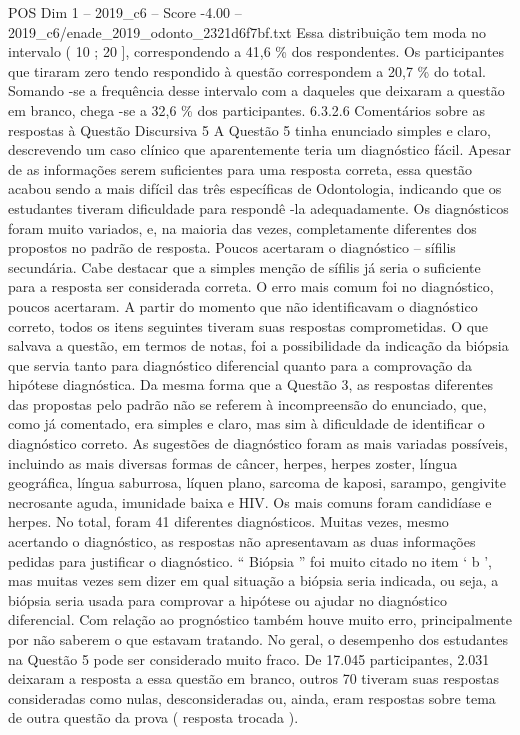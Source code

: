 \begin{textsample}{POS Dim 1 – 2019\_c6 – Score -4.00 – 2019\_c6/enade\_2019\_odonto\_2321d6f7bf.txt}
Essa distribuição tem moda no intervalo ( 10 ; 20 ], correspondendo a 41,6 \% dos respondentes.
Os participantes que tiraram zero tendo respondido à questão correspondem a 20,7 \% do total.
Somando -se a frequência desse intervalo com a daqueles que deixaram a questão em branco, chega -se a 32,6 \% dos participantes. 6.3.2.6 Comentários sobre as respostas à Questão Discursiva 5 A Questão 5 tinha enunciado simples e claro, descrevendo um caso clínico que aparentemente teria um diagnóstico fácil.
Apesar de as informações serem suficientes para uma resposta correta, essa questão acabou sendo a mais difícil das três específicas de Odontologia, indicando que os estudantes tiveram dificuldade para respondê -la adequadamente.
Os diagnósticos foram muito variados, e, na maioria das vezes, completamente diferentes dos propostos no padrão de resposta.
Poucos acertaram o diagnóstico – sífilis secundária.
Cabe destacar que a simples menção de sífilis já seria o suficiente para a resposta ser considerada correta.
O erro mais comum foi no diagnóstico, poucos acertaram.
A partir do momento que não identificavam o diagnóstico correto, todos os itens seguintes tiveram suas respostas comprometidas.
O que salvava a questão, em termos de notas, foi a possibilidade da indicação da biópsia que servia tanto para diagnóstico diferencial quanto para a comprovação da hipótese diagnóstica.
Da mesma forma que a Questão 3, as respostas diferentes das propostas pelo padrão não se referem à incompreensão do enunciado, que, como já comentado, era simples e claro, mas sim à dificuldade de identificar o diagnóstico correto.
As sugestões de diagnóstico foram as mais variadas possíveis, incluindo as mais diversas formas de câncer, herpes, herpes zoster, língua geográfica, língua saburrosa, líquen plano, sarcoma de kaposi, sarampo, gengivite necrosante aguda, imunidade baixa e HIV.
Os mais comuns foram candidíase e herpes.
No total, foram 41 diferentes diagnósticos.
Muitas vezes, mesmo acertando o diagnóstico, as respostas não apresentavam as duas informações pedidas para justificar o diagnóstico. “ Biópsia ” foi muito citado no item ‘ b ’, mas muitas vezes sem dizer em qual situação a biópsia seria indicada, ou seja, a biópsia seria usada para comprovar a hipótese ou ajudar no diagnóstico diferencial.
Com relação ao prognóstico também houve muito erro, principalmente por não saberem o que estavam tratando.
No geral, o desempenho dos estudantes na Questão 5 pode ser considerado muito fraco.
De 17.045 participantes, 2.031 deixaram a resposta a essa questão em branco, outros 70 tiveram suas respostas consideradas como nulas, desconsideradas ou, ainda, eram respostas sobre tema de outra questão da prova ( resposta trocada ).

\end{textsample}
